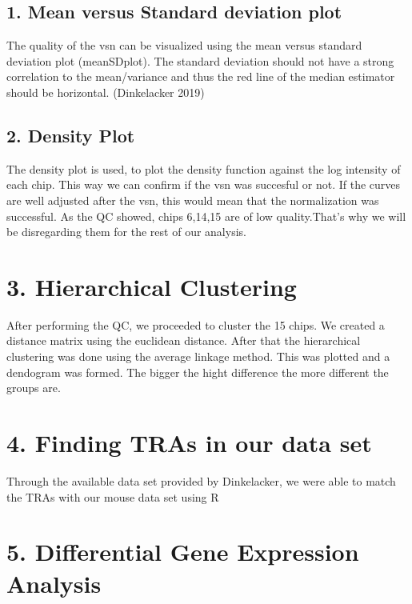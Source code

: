 \documentclass[
  parskip,
  oneside]{scrreprt}
\begin{document}
\hypertarget{mean-versus-standard-deviation-plot}{%
\subsection{1. Mean versus Standard deviation
plot}\label{mean-versus-standard-deviation-plot}}

The quality of the vsn can be visualized using the mean versus standard
deviation plot (meanSDplot). The standard deviation should not have a
strong correlation to the mean/variance and thus the red line of the
median estimator should be horizontal. (Dinkelacker 2019)

\hypertarget{density-plot}{%
\subsection{2. Density Plot}\label{density-plot}}

The density plot is used, to plot the density function against the log
intensity of each chip. This way we can confirm if the vsn was succesful
or not. If the curves are well adjusted after the vsn, this would mean
that the normalization was successful. As the QC showed, chips 6,14,15
are of low quality.That's why we will be disregarding them for the rest
of our analysis.

\hypertarget{hierarchical-clustering}{%
\section{3. Hierarchical Clustering}\label{hierarchical-clustering}}

After performing the QC, we proceeded to cluster the 15 chips. We
created a distance matrix using the euclidean distance. After that the
hierarchical clustering was done using the average linkage method. This
was plotted and a dendogram was formed. The bigger the hight difference
the more different the groups are.

\hypertarget{finding-tras-in-our-data-set}{%
\section{4. Finding TRAs in our data
set}\label{finding-tras-in-our-data-set}}

Through the available data set provided by Dinkelacker, we were able to
match the TRAs with our mouse data set using R

\hypertarget{differential-gene-expression-analysis}{%
\section{5. Differential Gene Expression
Analysis}\label{differential-gene-expression-analysis}}
\end{document}
